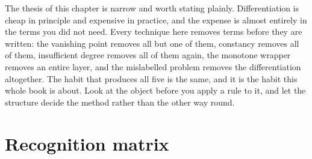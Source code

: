 The thesis of this chapter is narrow and worth stating plainly. Differentiation is cheap in principle and expensive in practice, and the expense is almost entirely in the terms you did not need. Every technique here removes terms before they are written: the vanishing point removes all but one of them, constancy removes all of them, insufficient degree removes all of them again, the monotone wrapper removes an entire layer, and the mislabelled problem removes the differentiation altogether. The habit that produces all five is the same, and it is the habit this whole book is about. Look at the object before you apply a rule to it, and let the structure decide the method rather than the other way round.

\section{Recognition matrix}
